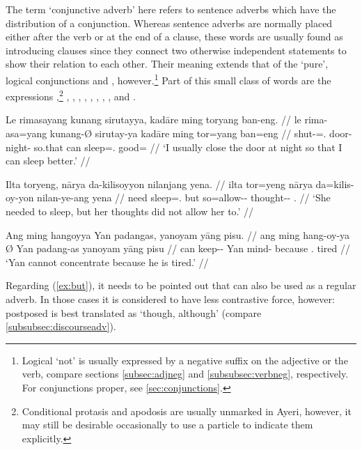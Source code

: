 The term `conjunctive adverb' here refers to sentence adverbs which have the
distribution of a conjunction. Whereas sentence adverbs are normally placed
either after the verb or at the end of a clause, these words are usually found
as introducing clauses since they connect two otherwise independent statements
to show their relation to each other. Their meaning extends that of the
`pure', logical conjunctions  and ,
however.\footnote{Logical `not' is usually expressed by a negative suffix on
the adjective or the verb, compare sections \ref{subsec:adjneg} and
\ref{subsubsec:verbneg}, respectively. For conjunctions proper, see
\autoref{sec:conjunctions}.} Part of this small class of words are the
expressions ,\footnote{Conditional protasis and
apodosis are usually unmarked in Ayeri, however, it may still be desirable
occasionally to use a particle to indicate them explicitly.}
,
,
,
,
,
,
,
, and 
.

\pex
\a\begingl
	\gla Le rimasayang kunang sirutayya, kadāre ming toryang ban-eng. //
	\glb le rima-asa=yang kunang-Ø sirutay-ya kadāre ming tor=yang 
		ban=eng //
	\glc \PatTI{} shut-\Hab{}=\Fsg{}.\Aarg{} door-\Top{} night-\Loc{} 
		so.that can sleep=\Fsg{}.\Aarg{} good=\Comp{} //
	\glft `I usually close the door at night so that I can sleep better.' //
\endgl

\a\label{ex:but}\begingl
	\gla Ilta toryeng, nārya da-kilisoyyon nilanjang yena. //
	\glb ilta tor=yeng nārya da=kilis-oy-yon nilan-ye-ang yena //
	\glc need sleep=\TsgF{}.\Aarg{} but so=allow-\Neg{}-\TplN{} 
		thought-\Pl{}-\Aarg{} \TsgF{}.\Gen{} //
	\glft `She needed to sleep, but her thoughts did not allow her to.' //
\endgl

\a\begingl
	\gla Ang ming hangoyya {} Yan padangas, yanoyam yāng pisu. //
	\glb ang ming hang-oy-ya Ø Yan padang-as yanoyam yāng pisu //
	\glc \AgtT{} can keep-\Neg{}-\TsgM{} \Top{} Yan mind-\Parg{} because 
		\TsgM{}.\Aarg{} tired //
	\glft `Yan cannot concentrate because he is tired.' //
\endgl

\xe

Regarding (\ref{ex:but}), it needs to be pointed out that  
can also be used as a regular adverb. In those cases it is considered to have 
less contrastive force, however: postposed  is best 
translated as `though, although' (compare \autoref{subsubsec:discourseadv}).

